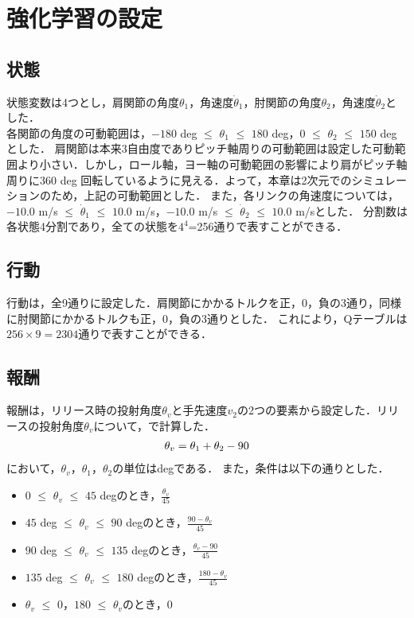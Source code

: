 \section{強化学習の設定}
\subsection{状態}
状態変数は4つとし，肩関節の角度$\theta_{1}$，角速度$\dot{\theta}_{1}$，肘関節の角度$\theta_{2}$，角速度$\dot{\theta}_{2}$とした．\\
各関節の角度の可動範囲は，$-180$ deg $\le$ $\theta_{1}$ $\le$ $180$ deg，$0$ $\le$ $\theta_{2}$ $\le$ $150$ deg\cite{range}とした．
肩関節は本来3自由度でありピッチ軸周りの可動範囲は設定した可動範囲より小さい．しかし，ロール軸，ヨー軸の可動範囲の影響により肩がピッチ軸周りに$360$ deg 回転しているように見える．よって，本章は2次元でのシミュレーションのため，上記の可動範囲とした．
また，各リンクの角速度については，$-10.0$ m/s $\le$ $\dot{\theta}_{1}$ $\le$ $10.0$ m/s，$-10.0$ m/s $\le$ $\dot{\theta}_{2}$ $\le$ $10.0$ m/sとした．
分割数は各状態4分割であり，全ての状態を$4^{4}$=256通りで表すことができる．
\subsection{行動}
行動は，全9通りに設定した．肩関節にかかるトルクを正，0，負の3通り，同様に肘関節にかかるトルクも正，0，負の3通りとした．
これにより，Qテーブルは$256 \times 9=2304$通りで表すことができる．
\subsection{報酬}
報酬は，リリース時の投射角度$\theta_{v}$と手先速度$v_{2}$の2つの要素から設定した．リリースの投射角度$\theta_{v}$について，で計算した．
\begin{eqnarray}
  \equlabel{2.19}
  \theta_{v}=\theta_{1}+\theta_{2}-90
\end{eqnarray}
において，$\theta_{v}$，$\theta_{1}$，$\theta_{2}$の単位はdegである．
また，条件は以下の通りとした．\\
\begin{itemize}
  \item $0$ $\le$ $\theta_{v}$ $\le$ $45$ degのとき，$\frac{\theta_{v}}{45}$
  \item $45$ deg $\le$ $\theta_{v}$ $\le$ $90$ degのとき，$\frac{90-\theta_{v}}{45}$
  \item $90$ deg $\le$ $\theta_{v}$ $\le$ $135$ degのとき，$\frac{\theta_{v}-90}{45}$
  \item $135$ deg $\le$ $\theta_{v}$ $\le$ $180$ degのとき，$\frac{180-\theta_{v}}{45}$
  \item $\theta_{v}$ $\le$ $0$，$180$ $\le$ $\theta_{v}$のとき，$0$\\
\end{itemize}

